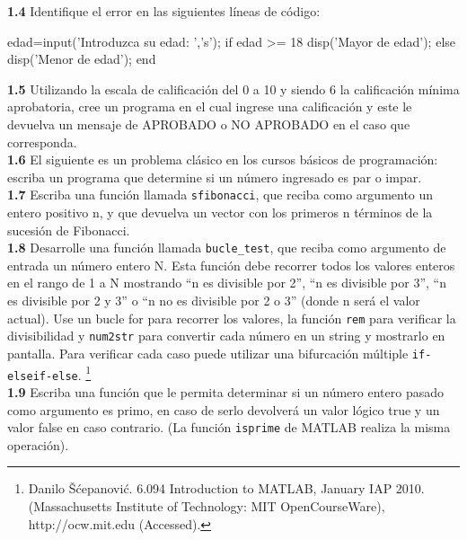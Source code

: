\textbf{1.4} Identifique el error en las siguientes líneas de código:

\begin{matlab}
edad=input('Introduzca su edad: ','s');
if edad >= 18
    disp('Mayor de edad');
else
    disp('Menor de edad');
end
\end{matlab}

\textbf{1.5} Utilizando la escala de calificación del 0 a 10 y siendo 6
la calificación mínima aprobatoria, cree un programa en el cual ingrese
una calificación y este le devuelva un mensaje de APROBADO o NO APROBADO
en el caso que corresponda. \\

\textbf{1.6} El siguiente es un problema clásico en los cursos básicos
de programación: escriba un programa que determine si un número
ingresado es par o impar. \\

\textbf{1.7} Escriba una función llamada \texttt{sfibonacci}, que reciba
como argumento un entero positivo n, y que devuelva un vector con los
primeros n términos de la sucesión de Fibonacci. \\

\textbf{1.8} Desarrolle una función llamada \texttt{bucle\_test}, que
reciba como argumento de entrada un número entero N. Esta función debe
recorrer todos los valores enteros en el rango de 1 a N mostrando ``n es
divisible por 2'', ``n es divisible por 3'', ``n es divisible por 2 y
3'' o ``n no es divisible por 2 o 3'' (donde n será el valor actual).
Use un bucle for para recorrer los valores, la función \texttt{rem} para
verificar la divisibilidad y \texttt{num2str} para convertir cada número
en un string y mostrarlo en pantalla. Para verificar cada caso puede
utilizar una bifurcación múltiple \texttt{if-elseif-else}. 
\footnote{Danilo
  Šćepanović. 6.094 Introduction to MATLAB, January IAP 2010.
  (Massachusetts Institute of Technology: MIT OpenCourseWare),
  http://ocw.mit.edu (Accessed).} \\

\textbf{1.9} Escriba una función que le permita determinar si un número
entero pasado como argumento es primo, en caso de serlo devolverá un
valor lógico true y un valor false en caso contrario. (La función
\texttt{isprime} de MATLAB realiza la misma operación).
